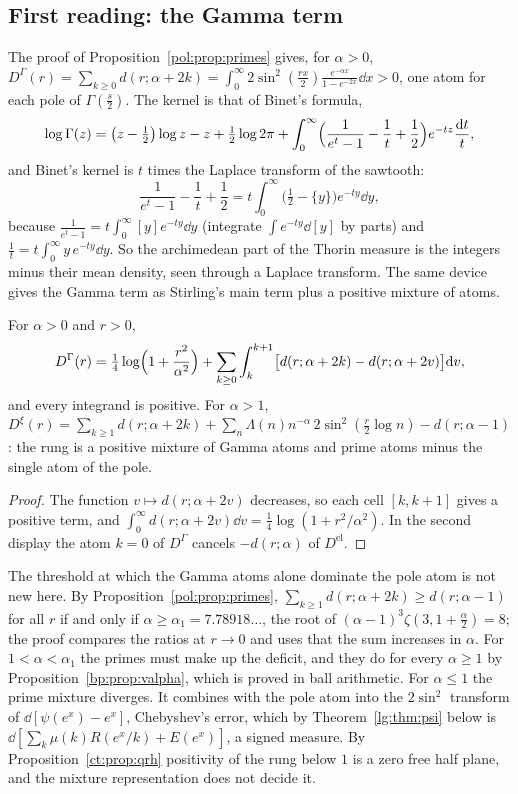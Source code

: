 \subsection*{First reading: the Gamma term}
The proof of Proposition~\ref{pol:prop:primes} gives, for $\alpha>0$, $D^\Gamma(r)=\sum_{k\ge0}d(r;\alpha+2k)=\int_0^\infty2\sin^2(\frac{rx}2)\frac{e^{-\alpha x}}{1-e^{-2x}}\dd x>0$, one atom for each pole of $\Gamma(\frac s2)$. The kernel is that of Binet's formula,
\[
\log\Gamma(z)=\bigl(z-\tfrac12\bigr)\log z-z+\tfrac12\log2\pi+\int_0^\infty\Bigl(\frac1{e^t-1}-\frac1t+\frac12\Bigr)e^{-tz}\frac{\mathrm{d} t}t ,
\]
and Binet's kernel is $t$ times the Laplace transform of the sawtooth:
\[
\frac1{e^t-1}-\frac1t+\frac12=t\int_0^\infty\bigl(\tfrac12-\{y\}\bigr)e^{-ty}\dd y ,
\]
because $\frac1{e^t-1}=t\int_0^\infty[y]e^{-ty}\dd y$ (integrate $\int e^{-ty}\dd[y]$ by parts) and $\frac1t=t\int_0^\infty y\,e^{-ty}\dd y$. So the archimedean part of the Thorin measure is the integers minus their mean density, seen through a Laplace transform. The same device gives the Gamma term as Stirling's main term plus a positive mixture of atoms.
\begin{proposition}\label{lg:prop:rung}
For $\alpha>0$ and $r>0$,
\[
D^\Gamma(r)=\tfrac14\log\Bigl(1+\frac{r^2}{\alpha^2}\Bigr)+\sum_{k\ge0}\int_k^{k+1}\bigl[d(r;\alpha+2k)-d(r;\alpha+2v)\bigr]\mathrm{d} v,
\]
and every integrand is positive. For $\alpha>1$, $D^\xi(r)=\sum_{k\ge1}d(r;\alpha+2k)+\sum_n\Lambda(n)n^{-\alpha}\,2\sin^2(\frac r2\log n)-d(r;\alpha-1)$: the rung is a positive mixture of Gamma atoms and prime atoms minus the single atom of the pole.
\end{proposition}
\begin{proof}
The function $v\mapsto d(r;\alpha+2v)$ decreases, so each cell $[k,k+1]$ gives a positive term, and $\int_0^\infty d(r;\alpha+2v)\dd v=\frac14\log(1+r^2/\alpha^2)$. In the second display the atom $k=0$ of $D^\Gamma$ cancels $-d(r;\alpha)$ of $D^{\mathrm{el}}$.
\end{proof}
The threshold at which the Gamma atoms alone dominate the pole atom is not new here. By Proposition~\ref{pol:prop:primes}, $\sum_{k\ge1}d(r;\alpha+2k)\ge d(r;\alpha-1)$ for all $r$ if and only if $\alpha\ge\alpha_1=7.78918\ldots$, the root of $(\alpha-1)^3\zeta(3,1+\frac\alpha2)=8$; the proof compares the ratios at $r\to0$ and uses that the sum increases in $\alpha$. For $1<\alpha<\alpha_1$ the primes must make up the deficit, and they do for every $\alpha\ge1$ by Proposition~\ref{bp:prop:valpha}, which is proved in ball arithmetic. For $\alpha\le1$ the prime mixture diverges. It combines with the pole atom into the $2\sin^2$ transform of $\dd[\psi(e^x)-e^x]$, Chebyshev's error, which by Theorem~\ref{lg:thm:psi} below is $\dd[\sum_k\mu(k)R(e^x/k)+E(e^x)]$, a signed measure. By Proposition~\ref{ct:prop:qrh} positivity of the rung below $1$ is a zero free half plane, and the mixture representation does not decide it.

